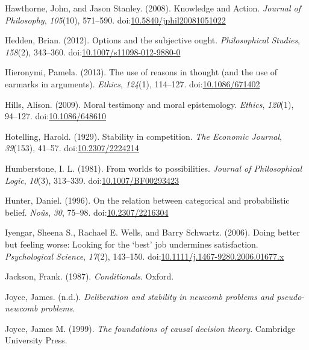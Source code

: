 \documentclass[
  12pt,
  letterpaper,
]{scrbook}
\newlength{\cslhangindent}
\newenvironment{CSLReferences}[2] %
 {\begin{list}{}{%
  \setlength{\itemindent}{0pt}
  \setlength{\leftmargin}{0pt}
  \setlength{\parsep}{0pt}
  \ifodd #1
   \setlength{\leftmargin}{\cslhangindent}
   \setlength{\itemindent}{-1\cslhangindent}
  \fi
  \setlength{\itemsep}{#2\baselineskip}}}
 {\end{list}}
\begin{document}
\begin{CSLReferences}{1}{0}
Hawthorne, John, and Jason Stanley. (2008). {Knowledge and Action}.
\emph{Journal of Philosophy}, \emph{105}(10), 571--590.
doi:\href{https://doi.org/10.5840/jphil20081051022}{10.5840/jphil20081051022}

Hedden, Brian. (2012). Options and the subjective ought.
\emph{Philosophical Studies}, \emph{158}(2), 343--360.
doi:\href{https://doi.org/10.1007/s11098-012-9880-0}{10.1007/s11098-012-9880-0}

Hieronymi, Pamela. (2013). The use of reasons in thought (and the use of
earmarks in arguments). \emph{Ethics}, \emph{124}(1), 114--127.
doi:\href{https://doi.org/10.1086/671402}{10.1086/671402}

Hills, Alison. (2009). Moral testimony and moral epistemology.
\emph{Ethics}, \emph{120}(1), 94--127.
doi:\href{https://doi.org/10.1086/648610}{10.1086/648610}

Hotelling, Harold. (1929). Stability in competition. \emph{The Economic
Journal}, \emph{39}(153), 41--57.
doi:\href{https://doi.org/10.2307/2224214}{10.2307/2224214}

Humberstone, I. L. (1981). From worlds to possibilities. \emph{Journal
of Philosophical Logic}, \emph{10}(3), 313--339.
doi:\href{https://doi.org/10.1007/BF00293423}{10.1007/BF00293423}

Hunter, Daniel. (1996). On the relation between categorical and
probabilistic belief. \emph{No{û}s}, \emph{30}, 75--98.
doi:\href{https://doi.org/10.2307/2216304}{10.2307/2216304}

Iyengar, Sheena S., Rachael E. Wells, and Barry Schwartz. (2006). Doing
better but feeling worse: Looking for the {`best'} job undermines
satisfaction. \emph{Psychological Science}, \emph{17}(2), 143--150.
doi:\href{https://doi.org/10.1111/j.1467-9280.2006.01677.x}{10.1111/j.1467-9280.2006.01677.x}

Jackson, Frank. (1987). \emph{Conditionals}. Oxford.

Joyce, James. (n.d.). \emph{Deliberation and stability in newcomb
problems and pseudo-newcomb problems}.

Joyce, James M. (1999). \emph{The foundations of causal decision
theory}. Cambridge University Press.


\end{CSLReferences}
\end{document}
